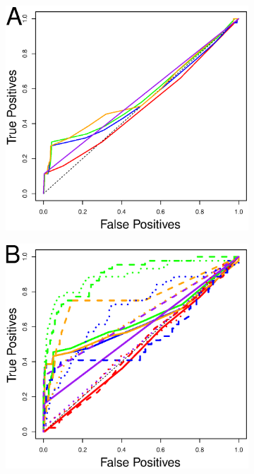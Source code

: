 \begin{figure} [h]
\centering
\begin{subfigure}[b]{.4\textwidth}
\includegraphics[width=\textwidth]{diagnosis/figs/key_exp_roc.eps}
\end{subfigure}
\begin{subfigure}[b]{.4\textwidth}
\includegraphics[width=\textwidth]{diagnosis/figs/key_dm_roc.eps}

\end{subfigure}
\end{figure}
